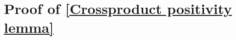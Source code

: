 \documentclass{amsart}
\numberwithin{equation}{section}
\theoremstyle{plain}
\theoremstyle{definition}
\theoremstyle{remark}
\begin{document}










\appendix
\section{Proof of \cref{Crossproduct positivity lemma}}
\end{document}
